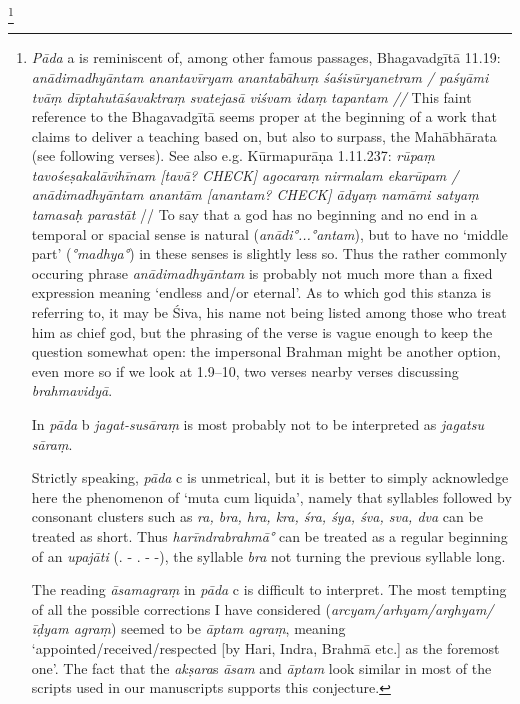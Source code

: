 \documentclass{article}
\newcommand{\skt}[1]{\textit{#1}}
\begin{document}
\footnote{\skt{Pāda} a is reminiscent of, among other famous passages, Bhagavadgītā 11.19:                        
                \skt{anādimadhyāntam anantavīryam 
                anantabāhuṃ śaśisūryanetram / 
                paśyāmi tvāṃ dīptahutāśavaktraṃ 
                svatejasā viśvam idaṃ tapantam //} 
              This faint reference to the Bhagavadgītā seems proper at the              beginning of a work that claims to deliver a teaching               based on, but also to surpass, the Mahābhārata (see following verses).                See also e.g. Kūrmapurāṇa 1.11.237:
                        \skt{rūpaṃ tavośeṣakalāvihīnam [tavā? CHECK]
                        agocaraṃ nirmalam ekarūpam / 
                        anādimadhyāntam anantām [anantam? CHECK] ādyaṃ  
                        namāmi satyaṃ tamasaḥ parastāt} // 
                To say that a god has no beginning and no end in a temporal or spacial                sense is natural (\skt{anādi°...°antam}), but to have no `middle part'                (\skt{°madhya°}) in these senses is slightly less so.                Thus the rather commonly occuring phrase \skt{anādimadhyāntam} is probably not                 much more than a fixed expression meaning `endless and/or eternal'.                As to which god this stanza is referring to, it may be Śiva,                his name not being listed among those who treat him as chief god,                but the phrasing of the verse is vague enough to keep the question somewhat open:                the impersonal Brahman might be another option, even more so if we                look at 1.9--10, two verses nearby verses discussing \skt{brahmavidyā}.                                

                In \skt{pāda} b \skt{jagat-susāraṃ} is most probably not                 to be interpreted as \skt{jagatsu sāraṃ}.                

                Strictly speaking, \skt{pāda} c is unmetrical, but it is better to                 simply acknowledge here the phenomenon of `muta cum liquida', namely                that syllables followed by consonant clusters such as                 \skt{ra, bra, hra, kra, śra, śya, śva, sva, dva} can be treated as short.                Thus \skt{harīndrabrahmā°} can be treated as a regular beginning                of an \skt{upajāti} (. - . - -), the syllable                 \skt{bra} not turning the previous syllable long.                

                The reading \skt{āsamagraṃ} in \skt{pāda} c is difficult to interpret.                 The most tempting of all the possible corrections I have considered                (\skt{arcyam/arhyam/arghyam/īḍyam agraṃ})                seemed to be \skt{āptam agraṃ}, meaning `appointed/received/respected                [by Hari, Indra, Brahmā etc.] as the foremost one'.                The fact that the \skt{akṣara}s \skt{āsam} and \skt{āptam} look similar                in most of the scripts used in our manuscripts supports this                conjecture.                

}
\end{document}

